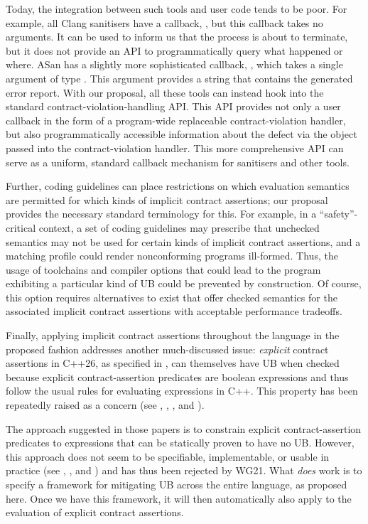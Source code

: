 Today, the integration between such tools and user code tends to be poor. For example, all Clang sanitisers have a callback, , but this callback takes no arguments. It can be used to inform us that the process is about to terminate, but it does not provide an API to programmatically query what happened or where. ASan has a slightly more sophisticated callback, , which takes a single argument of type . This argument provides a string that contains the generated error report. With our proposal, all these tools can instead hook into the standard contract-violation-handling API. This API provides not only a user callback in the form of a  program-wide replaceable contract-violation handler, but also programmatically accessible information about the defect via the  \mbox{} object passed into the contract-violation handler. This more comprehensive API can serve as a uniform, standard callback mechanism for sanitisers and other tools.

Further, coding guidelines can place restrictions on which evaluation semantics are permitted for which kinds of implicit contract assertions; our proposal provides the necessary standard terminology for this. For example, in a ``safety''-critical context, a set of coding guidelines may prescribe that unchecked semantics may not be used for certain kinds of implicit contract assertions, and a matching profile could render nonconforming programs ill-formed. Thus, the usage of toolchains and compiler options that could lead to the program exhibiting a particular kind of UB could be prevented by construction. Of course, this option requires alternatives to exist that offer checked semantics for the associated implicit contract assertions with acceptable performance tradeoffs.

Finally, applying implicit contract assertions throughout the language in the proposed fashion addresses another much-discussed issue: \emph{explicit} contract assertions in C++26, as specified in \cite{P2900R14}, can themselves have UB when checked because explicit contract-assertion predicates are boolean expressions and thus follow the usual rules for evaluating expressions in C++. This property has been repeatedly raised as a concern (see \cite{P2680R1}, \cite{P3173R0}, \cite{P3285R0}, and \cite{P3362R0}).

The approach suggested in those papers is to constrain explicit contract-assertion predicates to expressions that can be statically proven to have no UB. However, this approach does not seem to be specifiable, implementable, or usable in practice (see  \cite{P3376R0}, \cite{P3386R0}, and \cite{P3499R1}) and has thus been rejected by WG21. What \emph{does} work is to specify a framework for mitigating UB across the entire language, as proposed here. Once we have this framework, it will then automatically also apply to the evaluation of explicit contract assertions.

